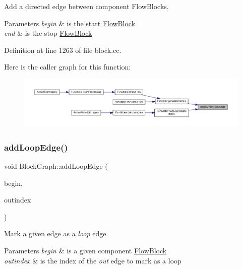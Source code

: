Add a directed edge between component Flow\+Blocks. 


\begin{DoxyParams}{Parameters}
{\em begin} & is the start \mbox{\hyperlink{class_flow_block}{Flow\+Block}} \\
\hline
{\em end} & is the stop \mbox{\hyperlink{class_flow_block}{Flow\+Block}} \\
\hline
\end{DoxyParams}


Definition at line 1263 of file block.\+cc.

Here is the caller graph for this function\+:
\nopagebreak
\begin{figure}[H]
\begin{center}
\leavevmode
\includegraphics[width=350pt]{class_block_graph_a0bd135694f8274979c03d005d796d81f_icgraph}
\end{center}
\end{figure}
\mbox{\label{class_block_graph_af4f0c927ad7c32721de2474b6180cb48}} 
\subsubsection{\texorpdfstring{addLoopEdge()}{addLoopEdge()}}
{\footnotesize\ttfamily void Block\+Graph\+::add\+Loop\+Edge (\begin{DoxyParamCaption}\item[{\mbox{\hyperlink{class_flow_block}{Flow\+Block}} $\ast$}]{begin,  }\item[{int4}]{outindex }\end{DoxyParamCaption})}



Mark a given edge as a {\itshape loop} edge. 


\begin{DoxyParams}{Parameters}
{\em begin} & is a given component \mbox{\hyperlink{class_flow_block}{Flow\+Block}} \\
\hline
{\em outindex} & is the index of the {\itshape out} edge to mark as a loop \\
\hline
\end{DoxyParams}


